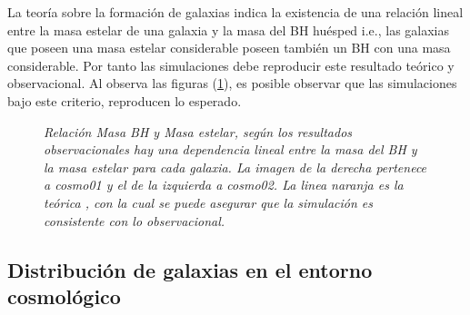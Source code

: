 La teoría sobre la formación de galaxias indica la existencia de una relación lineal entre la masa estelar de una galaxia y la masa del BH huésped \cite{marconi2003} i.e., las galaxias que poseen una masa estelar considerable poseen también un BH con una masa considerable. Por tanto las simulaciones debe reproducir este resultado teórico y observacional. Al observa las figuras (\ref{fig: Mass_bhVsMass_stelar}), es posible observar que las simulaciones bajo este criterio, reproducen lo esperado. 
%
 \begin{figure}
 \centering
 \caption{\emph{Relación Masa BH y Masa estelar, según los resultados observacionales hay una dependencia lineal entre la masa del BH y la masa estelar para cada galaxia. La imagen de la derecha pertenece a {\it{cosmo01}} y el de la izquierda a {\it{cosmo02}}. La linea naranja es la teórica \cite{McConnell2013}, con la cual se puede asegurar que la simulación es consistente con lo observacional.}}
 \label{fig: Mass_bhVsMass_stelar}
\end{figure}
%
    \subsection{ Distribución de galaxias en el entorno cosmológico}
    \label{subsec: Distribucion de galaxias}

